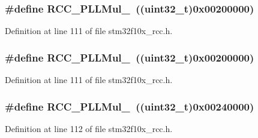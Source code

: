\subsubsection[{\texorpdfstring{R\+C\+C\+\_\+\+P\+L\+L\+Mul\+\_\+10}{RCC_PLLMul_10}}]{\setlength{\rightskip}{0pt plus 5cm}\#define R\+C\+C\+\_\+\+P\+L\+L\+Mul\+\_~(({\bf uint32\+\_\+t})0x00200000)}\hypertarget{group___p_l_l__multiplication__factor_ga572881d8c1e6c5b635198b286a2f4087}{}\label{group___p_l_l__multiplication__factor_ga572881d8c1e6c5b635198b286a2f4087}


Definition at line 111 of file stm32f10x\+\_\+rcc.\+h.

\subsubsection[{\texorpdfstring{R\+C\+C\+\_\+\+P\+L\+L\+Mul\+\_\+10}{RCC_PLLMul_10}}]{\setlength{\rightskip}{0pt plus 5cm}\#define R\+C\+C\+\_\+\+P\+L\+L\+Mul\+\_~(({\bf uint32\+\_\+t})0x00200000)}\hypertarget{group___p_l_l__multiplication__factor_ga572881d8c1e6c5b635198b286a2f4087}{}\label{group___p_l_l__multiplication__factor_ga572881d8c1e6c5b635198b286a2f4087}


Definition at line 111 of file stm32f10x\+\_\+rcc.\+h.

\subsubsection[{\texorpdfstring{R\+C\+C\+\_\+\+P\+L\+L\+Mul\+\_\+11}{RCC_PLLMul_11}}]{\setlength{\rightskip}{0pt plus 5cm}\#define R\+C\+C\+\_\+\+P\+L\+L\+Mul\+\_~(({\bf uint32\+\_\+t})0x00240000)}\hypertarget{group___p_l_l__multiplication__factor_ga15da9e109b8556e96bdb9543347366c9}{}\label{group___p_l_l__multiplication__factor_ga15da9e109b8556e96bdb9543347366c9}


Definition at line 112 of file stm32f10x\+\_\+rcc.\+h.

